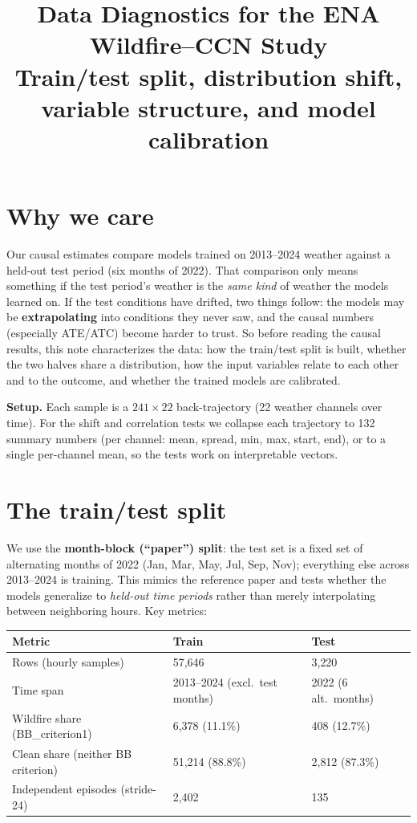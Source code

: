 \documentclass[11pt]{article}
\title{\vspace{-1.5cm}Data Diagnostics for the ENA Wildfire--CCN Study\\
{\large Train/test split, distribution shift, variable structure, and model calibration}}
\author{}
\date{}
\begin{document}
\maketitle
\vspace{-1.1cm}

\section*{Why we care}
Our causal estimates compare models trained on 2013--2024 weather against a
held-out test period (six months of 2022). That comparison only means something if
the test period's weather is the \emph{same kind} of weather the models learned on.
If the test conditions have drifted, two things follow: the models may be
\textbf{extrapolating} into conditions they never saw, and the causal numbers
(especially ATE/ATC) become harder to trust. So before reading the causal results,
this note characterizes the data: how the train/test split is built, whether the two
halves share a distribution, how the input variables relate to each other and to the
outcome, and whether the trained models are calibrated.

\textbf{Setup.} Each sample is a $241\times22$ back-trajectory (22 weather channels
over time). For the shift and correlation tests we collapse each trajectory to 132
summary numbers (per channel: mean, spread, min, max, start, end), or to a single
per-channel mean, so the tests work on interpretable vectors.

\section*{The train/test split}
We use the \textbf{month-block (``paper'') split}: the test set is a fixed set of
alternating months of 2022 (Jan, Mar, May, Jul, Sep, Nov); everything else across
2013--2024 is training. This mimics the reference paper and tests whether the models
generalize to \emph{held-out time periods} rather than merely interpolating between
neighboring hours. Key metrics:

\begin{center}
\begin{tabular}{lll}
\hline
\textbf{Metric} & \textbf{Train} & \textbf{Test} \\
\hline
Rows (hourly samples)              & 57{,}646 & 3{,}220 \\
Time span                          & 2013--2024 (excl.\ test months) & 2022 (6 alt.\ months) \\
Wildfire share (BB\_criterion1)    & 6{,}378 (11.1\%) & 408 (12.7\%) \\
Clean share (neither BB criterion) & 51{,}214 (88.8\%) & 2{,}812 (87.3\%) \\
Independent episodes (stride-24)   & 2{,}402 & 135 \\
\hline
\end{tabular}
\end{center}
\end{document}

